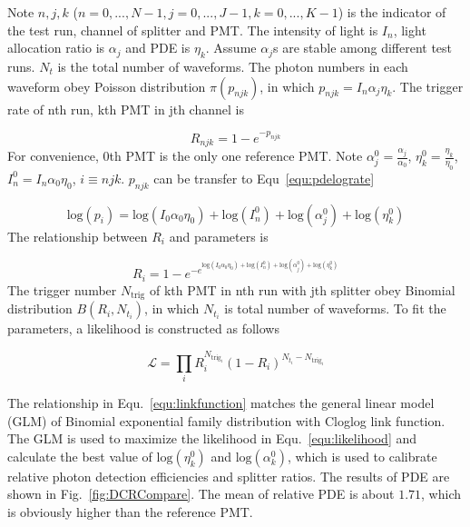 Note $n,j,k$ ($n=0,...,N-1, j=0,...,J-1, k=0,...,K-1$) is the indicator of the test run, channel of splitter and PMT. The intensity of light is $I_n$, light allocation ratio is $\alpha_j$ and PDE is $\eta_k$. Assume $\alpha_j$s are stable among different test runs. $N_t$ is the total number of waveforms. The photon numbers in each waveform obey Poisson distribution $\pi(p_{njk})$, in which $p_{njk}=I_n\alpha_j\eta_k$. The trigger rate of nth run, kth PMT in jth channel is

\begin{equation}
    \label{equ:pderate}
    R_{njk}=1-e^{-p_{njk}}
\end{equation}
For convenience, 0th PMT is the only one reference PMT. Note $\alpha_j^0=\frac{\alpha_j}{\alpha_0}$, $\eta_k^0=\frac{\eta_k}{\eta_0}$, $I_n^0=I_n\alpha_0\eta_0$, $i\equiv njk$. $p_{njk}$ can be transfer to Equ~\eqref{equ:pdelograte}

\begin{equation}
    \label{equ:pdelograte}
    \mathrm{log}(p_{i})=\mathrm{log}(I_0\alpha_0\eta_0)+\mathrm{log}(I_n^0)+\mathrm{log}(\alpha_j^0)+\mathrm{log}(\eta_k^0)
\end{equation}
The relationship between $R_{i}$ and parameters is

\begin{equation}
    \label{equ:linkfunction}
    R_{i}=1-e^{-e^{\mathrm{log}(I_0\alpha_0\eta_0)+\mathrm{log}(I_n^0)+\mathrm{log}(\alpha_j^0)+\mathrm{log}(\eta_k^0)}}
\end{equation}
The trigger number $N_{\mathrm{trig}}$ of kth PMT in nth run with jth splitter obey Binomial distribution $B(R_{i},N_{t_{i}})$, in which $N_{t_{i}}$ is total number of waveforms. To fit the parameters, a likelihood is constructed as follows

\begin{equation}
    \label{equ:likelihood}
    \mathcal{L}=\prod_{i}{R_{i}^{N_{\mathrm{trig}_{i}}}(1-R_{i})^{N_{t_{i}}-N_{\mathrm{trig}_{i}}}}
\end{equation}

The relationship in Equ.~\eqref{equ:linkfunction} matches the general linear model (GLM) of Binomial exponential family distribution with Cloglog link function\cite{glm}. The GLM is used to maximize the likelihood in Equ.~\eqref{equ:likelihood} and calculate the best value of $\mathrm{log}(\eta_k^0)$ and $\mathrm{log}(\alpha_k^0)$, which is used to calibrate relative photon detection efficiencies and splitter ratios. The results of PDE are shown in Fig.~\ref{fig:DCRCompare}. The mean of relative PDE is about $1.71$, which is obviously higher than the reference PMT.

